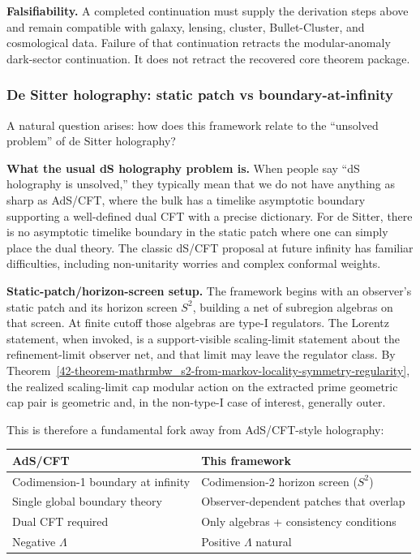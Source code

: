 \textbf{Falsifiability.} A completed continuation must supply the derivation steps above and remain compatible with galaxy, lensing, cluster, Bullet-Cluster, and cosmological data. Failure of that continuation retracts the modular-anomaly dark-sector continuation. It does not retract the recovered core theorem package.

\subsubsection{De Sitter holography: static patch vs boundary-at-infinity}\label{516-de-sitter-holography-static-patch-vs-boundary-at-infinity}

A natural question arises: how does this framework relate to the ``unsolved problem'' of de Sitter holography?

\textbf{What the usual dS holography problem is.} When people say ``dS holography is unsolved,'' they typically mean that we do not have anything as sharp as AdS/CFT, where the bulk has a timelike asymptotic boundary supporting a well-defined dual CFT with a precise dictionary. For de Sitter, there is no asymptotic timelike boundary in the static patch where one can simply place the dual theory. The classic dS/CFT proposal at future infinity has familiar difficulties, including non-unitarity worries and complex conformal weights.

\textbf{Static-patch/horizon-screen setup.} The framework begins with an observer's static patch and its horizon screen \(S^2\), building a net of subregion algebras on that screen. At finite cutoff those algebras are type-I regulators. The Lorentz statement, when invoked, is a support-visible scaling-limit statement about the refinement-limit observer net, and that limit may leave the regulator class. By Theorem~\ref{42-theorem-mathrmbw_s2-from-markov-locality-symmetry-regularity}, the realized scaling-limit cap modular action on the extracted prime geometric cap pair is geometric and, in the non-type-I case of interest, generally outer.

This is therefore a fundamental fork away from AdS/CFT-style holography:

{\def\LTcaptype{none}
\begin{longtable}[]{@{}>{\RaggedRight\arraybackslash}p{}>{\RaggedRight\arraybackslash}p{}@{}}
\toprule\noalign{}
AdS/CFT & This framework \\
\midrule\noalign{}
\endhead
\bottomrule\noalign{}
\endlastfoot
Codimension-1 boundary at infinity & Codimension-2 horizon screen (\(S^2\)) \\
Single global boundary theory & Observer-dependent patches that overlap \\
Dual CFT required & Only algebras + consistency conditions \\
Negative \(\Lambda\) & Positive \(\Lambda\) natural \\
\end{longtable}
}

